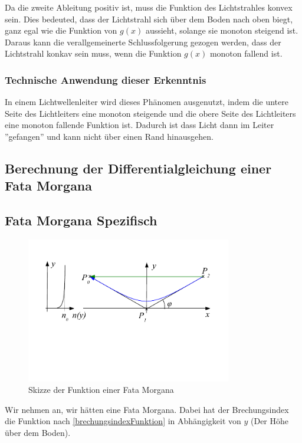 Da die zweite Ableitung positiv ist, muss die Funktion des Lichtstrahles konvex sein.
Dies bedeuted, dass der Lichtstrahl sich über dem Boden nach oben biegt, ganz egal wie die Funktion von $g(x)$ aussieht, solange sie monoton steigend ist.
Daraus kann die verallgemeinerte Schlussfolgerung gezogen werden, dass der Lichtstrahl konkav sein muss, wenn die Funktion $g(x)$ monoton  fallend ist. 
\subsubsection{Technische Anwendung dieser Erkenntnis}
In einem Lichtwellenleiter wird dieses Phänomen ausgenutzt, indem die untere Seite des Lichtleiters eine monoton steigende
und die obere Seite des Lichtleiters eine monoton fallende Funktion ist. 
Dadurch ist dass Licht dann im Leiter ''gefangen'' und kann nicht über einen Rand hinausgehen.

\subsection{Berechnung der Differentialgleichung einer Fata Morgana}






\subsection{Fata Morgana Spezifisch}

\begin{figure}[H]
	\includegraphics[width=0.8\textwidth]{./picture/FataMorgana.pdf}
	\caption{Skizze der Funktion einer Fata Morgana}
	\label{Ab:fata}
\end{figure}


Wir nehmen an, wir hätten eine Fata Morgana. 
Dabei hat der Brechungsindex die Funktion nach \eqref{brechungsindexFunktion} in Abhängigkeit von $y$ 
(Der Höhe über dem Boden).

